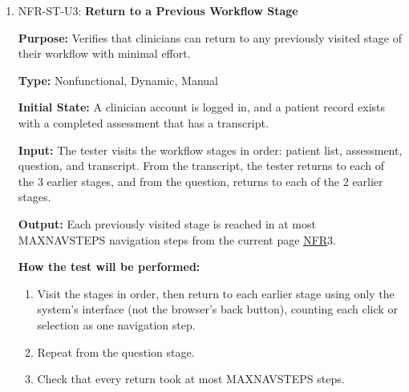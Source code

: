 \documentclass[12pt, titlepage]{article}
\newcommand{\srsnfr}[1]{\href{https://github.com/Nour-Fawaz/MacaBoca/blob/main/pdfs/SRS/SRS.pdf}{NFR}}
\renewcommand{\_}{\oldunderscore\allowbreak}
\begin{document}
\begin{enumerate}
  \item NFR-ST-U3: \textbf{Return to a Previous Workflow Stage\\}
  \begin{mdframed}[linewidth=0.5mm]
      \textbf{Purpose:} Verifies that clinicians can return to any previously visited stage of their workflow with minimal effort. \par
      \textbf{Type:} Nonfunctional, Dynamic, Manual \par
      \textbf{Initial State:} A clinician account is logged in, and a patient record exists with a completed assessment that has a transcript. \par
      \textbf{Input:} The tester visits the workflow stages in order: patient list, assessment, question, and transcript. From the transcript, the tester returns to each of the 3 earlier stages, and from the question, returns to each of the 2 earlier stages. \par
      \textbf{Output:} Each previously visited stage is reached in at most MAX\_NAV\_STEPS navigation steps from the current page \srsnfr*{3}. \par
      \textbf{How the test will be performed:}
      \begin{enumerate}
        \item[1.] Visit the stages in order, then return to each earlier stage using only the system's interface (not the browser's back button), counting each click or selection as one navigation step.
        \item[2.] Repeat from the question stage.
        \item[3.] Check that every return took at most MAX\_NAV\_STEPS steps.
      \end{enumerate}
  \end{mdframed}


\end{enumerate}
\end{document}
